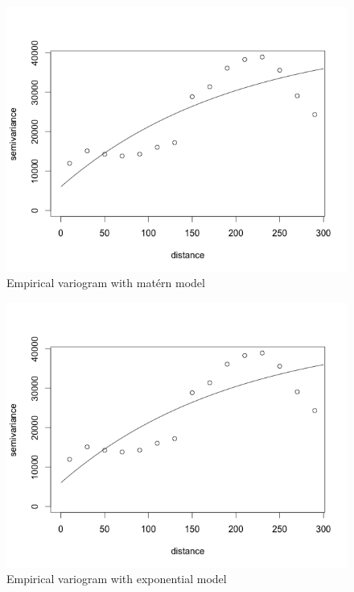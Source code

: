\documentclass[12pt,twoside]{reedthesis}
\begin{document}
\begin{figure}[h!]
	   
	       \centering
	  
	    \includegraphics[scale=0.5]{vario_matern}
	
	     \caption{Empirical variogram with mat\'ern model}
	 \label{matern}
	\end{figure}
	
\begin{figure}[h!]
	   
	       \centering
	  
	    \includegraphics[scale=0.5]{vario_exp}
	
	     \caption{Empirical variogram with exponential model}
	 \label{exp}
	\end{figure}
	
\end{document}
